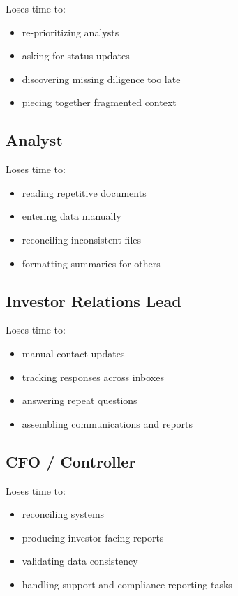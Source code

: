 \documentclass[11pt]{article}
\begin{document}
Loses time to:

\begin{itemize}
\item re-prioritizing analysts
\item asking for status updates
\item discovering missing diligence too late
\item piecing together fragmented context
\end{itemize}

\subsection{Analyst}

Loses time to:

\begin{itemize}
\item reading repetitive documents
\item entering data manually
\item reconciling inconsistent files
\item formatting summaries for others
\end{itemize}

\subsection{Investor Relations Lead}

Loses time to:

\begin{itemize}
\item manual contact updates
\item tracking responses across inboxes
\item answering repeat questions
\item assembling communications and reports
\end{itemize}

\subsection{CFO / Controller}

Loses time to:

\begin{itemize}
\item reconciling systems
\item producing investor-facing reports
\item validating data consistency
\item handling support and compliance reporting tasks
\end{itemize}
\end{document}
